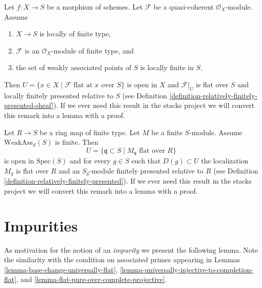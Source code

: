 \begin{remark}
\label{remark-finite-type-flat}
Let $f : X \to S$ be a morphism of schemes.
Let $\mathcal{F}$ be a quasi-coherent $\mathcal{O}_X$-module.
Assume
\begin{enumerate}
\item $X \to S$ is locally of finite type,
\item $\mathcal{F}$ is an $\mathcal{O}_X$-module of finite type, and
\item the set of weakly associated points of $S$ is locally finite in $S$.
\end{enumerate}
Then $U = \{x \in X \mid \mathcal{F}\text{ flat at }x\text{ over }S\}$
is open in $X$ and $\mathcal{F}|_U$ is flat over $S$ and locally
finitely presented relative to $S$ (see
Definition \ref{definition-relatively-finitely-presented-sheaf}).
If we ever need this result in the stacks project we will convert
this remark into a lemma with a proof.
\end{remark}

\begin{remark}
\label{remark-finite-type-flat-algebra}
Let $R \to S$ be a ring map of finite type.
Let $M$ be a finite $S$-module.
Assume $\text{WeakAss}_S(S)$ is finite.
Then
$$
U = \{\mathfrak q \subset S \mid M_{\mathfrak q}\text{ flat over }R\}
$$
is open in $\text{Spec}(S)$ and for every $g \in S$ such that
$D(g) \subset U$ the localization $M_g$ is flat over $R$ and
an $S_g$-module finitely presented relative to $R$ (see
Definition \ref{definition-relatively-finitely-presented}).
If we ever need this result in the stacks project we will convert
this remark into a lemma with a proof.
\end{remark}









\section{Impurities}
\label{section-impure}

\noindent
As motivation for the notion of an {\it impurity} we present the
following lemma. Note the similarity with the condition on
associated primes appearing in
Lemmas \ref{lemma-base-change-universally-flat},
\ref{lemma-universally-injective-to-completion-flat}, and
\ref{lemma-flat-pure-over-complete-projective}.

